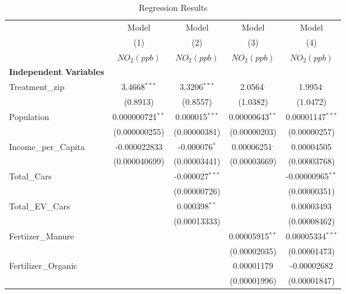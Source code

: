 \documentclass[12pt]{article}
\begin{document}
	
	\clearpage
	\newpage
	
	\begin{table}[h]
		\centering
		\caption{Regression Results}
		\label{tab:regression_results}
		\begin{threeparttable}
			\begin{adjustbox}{max width=\textwidth}
				\begin{tabular}{l c c c c}
					\toprule
					\toprule
					& Model & Model & Model & Model \\
					& (1) & (2) & (3) & (4) \\
					\midrule
					& $NO_2 (ppb)$ & $NO_2 (ppb)$ & $NO_2 (ppb)$ & $NO_2 (ppb)$ \\
					\midrule
					\textbf{Independent Variables} & & & & \\
					Treatment\_zip & 3.4668$^{***}$ & 3.3206$^{***}$ & 2.0564$^{.}$ & 1.9954$^{.}$ \\
					& {\footnotesize (0.8913)} & {\footnotesize (0.8557)} & {\footnotesize (1.0382)} & {\footnotesize (1.0472)} \\
					Population & 0.000000721$^{**}$ & 0.000015$^{***}$ & 0.00000643$^{**}$ & 0.00001147$^{***}$ \\
					& {\footnotesize (0.000000255)} & {\footnotesize (0.00000381)} & {\footnotesize (0.00000203)} & {\footnotesize (0.00000257)} \\
					Income\_per\_Capita & -0.000022833 & -0.000076$^{*}$ & 0.00006251$^{.}$ & 0.00004505 \\
					& {\footnotesize (0.000040699)} & {\footnotesize (0.00003441)} & {\footnotesize (0.00003669)} & {\footnotesize (0.00003768)} \\
					Total\_Cars &  & -0.000027$^{***}$ &  & -0.00000965$^{**}$ \\  
					&  & {\footnotesize (0.00000726)} &  & {\footnotesize (0.00000351)} \\
					Total\_EV\_Cars &  & 0.000398$^{**}$ &  & 0.00003493 \\  
					&  & {\footnotesize (0.00013333)} &  & {\footnotesize (0.00008462)} \\
					Fertiizer\_Manure &  &  & 0.00005915$^{**}$ & 0.00005334$^{***}$ \\  
					&  &  & {\footnotesize (0.00002035)} & {\footnotesize (0.00001473)} \\
					Fertilizer\_Organic &  &  & 0.00001179 & -0.00002682 \\  
					&  &  & {\footnotesize (0.00001996)} & {\footnotesize (0.00001847)} \\

\end{tabular}
\end{adjustbox}
\end{threeparttable}
\end{table}
\end{document}
